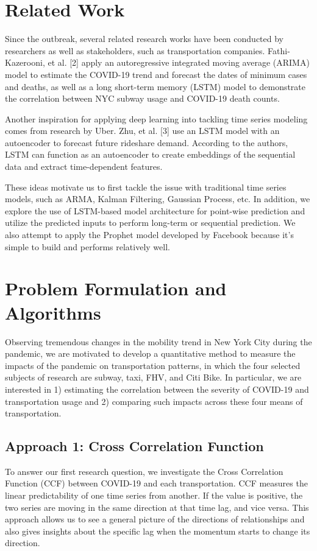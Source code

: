\documentclass{article}
\begin{document}
\section{Related Work}
Since the outbreak, several related research works have been conducted by researchers as well as stakeholders, such as transportation companies. Fathi-Kazerooni, et al. [2]  apply an autoregressive integrated moving average (ARIMA) model to estimate the COVID-19 trend and forecast the dates of minimum cases and deaths, as well as a long short-term memory (LSTM) model to demonstrate the correlation between NYC subway usage and COVID-19 death counts. 

Another inspiration for applying deep learning into tackling time series modeling comes from research by Uber. Zhu, et al. [3] use an LSTM model with an autoencoder to forecast future rideshare demand. According to the authors, LSTM can function as an autoencoder to create embeddings of the sequential data and extract time-dependent features. 

These ideas motivate us to first tackle the issue with traditional time series models, such as ARMA, Kalman Filtering, Gaussian Process, etc. In addition, we explore the use of LSTM-based model architecture for point-wise prediction and utilize the predicted inputs to perform long-term or sequential prediction. We also attempt to apply the Prophet model developed by Facebook because it’s simple to build and performs relatively well.

\section{Problem Formulation and Algorithms}

Observing tremendous changes in the mobility trend in New York City during the pandemic, we are motivated to develop a quantitative method to measure the impacts of the pandemic on transportation patterns, in which the four selected subjects of research are subway, taxi, FHV, and Citi Bike. In particular, we are interested in 1) estimating the correlation between the severity of COVID-19 and transportation usage and 2) comparing such impacts across these four means of transportation. 

\subsection{Approach 1: Cross Correlation Function}

To answer our first research question, we investigate the Cross Correlation Function (CCF) between COVID-19 and each transportation. CCF measures the linear predictability of one time series from another. If the value is positive, the two series are moving in the same direction at that time lag, and vice versa. This approach allows us to see a general picture of the directions of relationships and also gives insights about the specific lag when the momentum starts to change its direction. 
\end{document}
